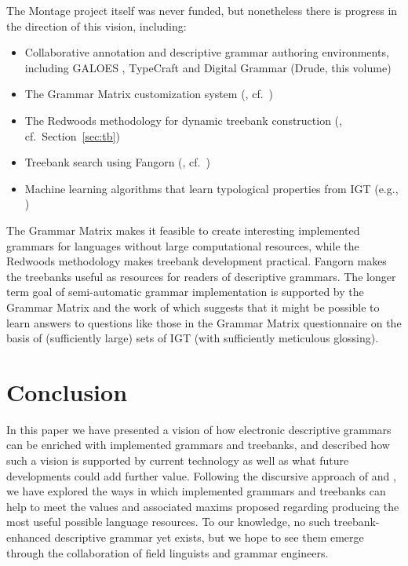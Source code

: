 The Montage project itself was never funded, but nonetheless there is progress
in the direction of this vision, including:

\begin{itemize}
\item Collaborative annotation and descriptive grammar authoring environments,
including GALOES \citep{Nordhoff:07}, TypeCraft \citep{Bee:Mih:09} and Digital Grammar \nocite{Drude:11} (Drude, this volume)
\item The Grammar Matrix customization system (, cf.\ )
\item The Redwoods methodology for dynamic treebank construction (, cf.\ Section~\ref{sec:tb})
\item Treebank search using Fangorn (, cf.\ )
\item Machine learning algorithms that learn typological properties
from IGT (e.g., )
\end{itemize}

The Grammar Matrix makes it feasible to create interesting implemented
grammars for languages without large computational resources, while the Redwoods methodology
makes treebank development practical. Fangorn makes the
treebanks useful as resources for readers of descriptive grammars.
The longer term goal of semi-automatic grammar implementation is
supported by the Grammar Matrix and the work of 
which suggests that it might be possible to learn answers to questions
like those in the Grammar Matrix questionnaire on the basis of
(sufficiently large) sets of IGT (with sufficiently meticulous
glossing).

\section{Conclusion}

In this paper we have presented a vision of how electronic descriptive
grammars can be enriched with implemented grammars and treebanks, and
described how such a vision is supported by current technology as well
as what future developments could add further value.  Following the
discursive approach of  and
, we have explored the ways in which implemented
grammars and treebanks can help to meet the values and associated
maxims proposed regarding producing the most useful possible language
resources.  To our knowledge, no such treebank-enhanced descriptive
grammar yet exists, but we hope to see them emerge through the
collaboration of field linguists and grammar engineers.


